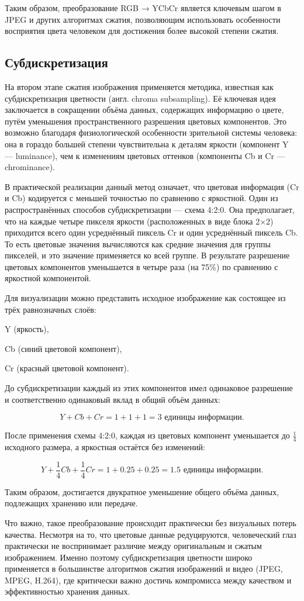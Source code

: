     Таким образом, преобразование RGB → YCbCr является ключевым шагом в JPEG и других алгоритмах сжатия, 
    позволяющим использовать особенности восприятия цвета человеком для достижения более высокой степени сжатия.




\subsection{Субдискретизация}
На втором этапе сжатия изображения применяется методика, известная как субдискретизация цветности (англ. chroma subsampling). 
Её ключевая идея заключается в сокращении объёма данных, содержащих информацию о цвете, путём уменьшения пространственного разрешения цветовых компонентов. 
Это возможно благодаря физиологической особенности зрительной системы человека: 
она в гораздо большей степени чувствительна к деталям яркости (компонент Y — luminance), чем к изменениям цветовых оттенков (компоненты Cb и Cr — chrominance).

В практической реализации данный метод означает, что цветовая информация (Cr и Cb) кодируется с меньшей точностью по сравнению с яркостной. 
Один из распространённых способов субдискретизации — схема 4:2:0. Она предполагает, что на каждые четыре пикселя яркости (расположенных в виде блока 2×2) приходится всего один усреднённый пиксель Cr и один усреднённый пиксель Cb. 
То есть цветовые значения вычисляются как средние значения для группы пикселей, и это значение применяется ко всей группе. 
В результате разрешение цветовых компонентов уменьшается в четыре раза (на 75\%) по сравнению с яркостной компонентой.

Для визуализации можно представить исходное изображение как состоящее из трёх равнозначных слоёв:

Y (яркость),

Cb (синий цветовой компонент),

Cr (красный цветовой компонент).

До субдискретизации каждый из этих компонентов имел одинаковое разрешение и соответственно одинаковый вклад в общий объём данных:

$$
Y + Cb + Cr = 1+1+1=3 \text{ единицы информации}.
$$

После применения схемы 4:2:0, каждая из цветовых компонент уменьшается до $\frac{1}{4}$ исходного размера, а яркостная остаётся без изменений:

$$
Y + \frac{1}{4}Cb + \frac{1}{4}Cr = 1 + 0.25 + 0.25 = 1.5 \text{ единицы информации}.
$$

Таким образом, достигается двукратное уменьшение общего объёма данных, подлежащих хранению или передаче.

Что важно, такое преобразование происходит практически без визуальных потерь качества. 
Несмотря на то, что цветовые данные редуцируются, человеческий глаз практически не воспринимает различие между оригинальным и сжатым изображением. 
Именно поэтому субдискретизация цветности широко применяется в большинстве алгоритмов сжатия изображений и видео (JPEG, MPEG, H.264),
где критически важно достичь компромисса между качеством и эффективностью хранения данных.
